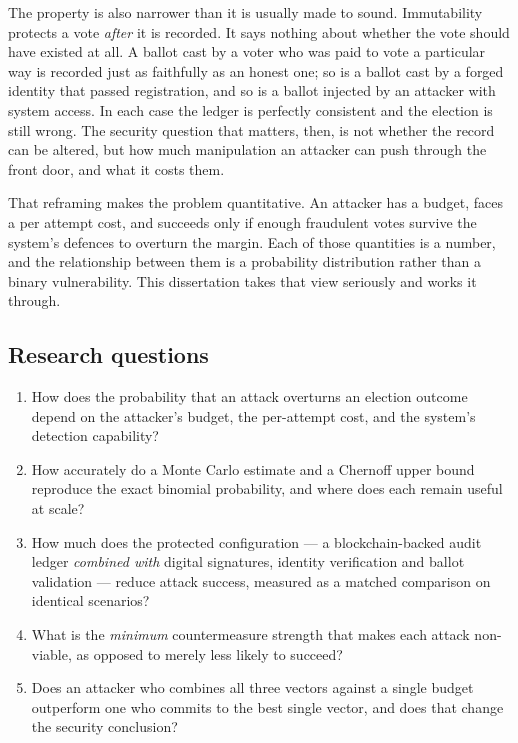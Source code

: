 \documentclass[11pt,a4paper]{article}
\begin{document}
The property is also narrower than it is usually made to sound. Immutability protects a
vote \emph{after} it is recorded. It says nothing about whether the vote should have
existed at all. A ballot cast by a voter who was paid to vote a particular way is
recorded just as faithfully as an honest one; so is a ballot cast by a forged identity
that passed registration, and so is a ballot injected by an attacker with system access.
In each case the ledger is perfectly consistent and the election is still wrong. The
security question that matters, then, is not whether the record can be altered, but how
much manipulation an attacker can push through the front door, and what it costs them.

That reframing makes the problem quantitative. An attacker has a budget, faces a per
attempt cost, and succeeds only if enough fraudulent votes survive the system's
defences to overturn the margin. Each of those quantities is a number, and the
relationship between them is a probability distribution rather than a binary
vulnerability. This dissertation takes that view seriously and works it through.

\subsection{Research questions}

\begin{enumerate}[label=\textbf{RQ\arabic*.},leftmargin=2.6em,itemsep=3pt]
  \item How does the probability that an attack overturns an election outcome depend on
        the attacker's budget, the per-attempt cost, and the system's detection
        capability?
  \item How accurately do a Monte Carlo estimate and a Chernoff upper bound reproduce
        the exact binomial probability, and where does each remain useful at scale?
  \item How much does the protected configuration --- a blockchain-backed
        audit ledger \emph{combined with} digital signatures, identity
        verification and ballot validation --- reduce attack success,
        measured as a matched comparison on identical scenarios?
  \item What is the \emph{minimum} countermeasure strength that makes each attack
        non-viable, as opposed to merely less likely to succeed?
  \item Does an attacker who combines all three vectors against a single budget
        outperform one who commits to the best single vector, and does that change the
        security conclusion?
\end{enumerate}
\end{document}
